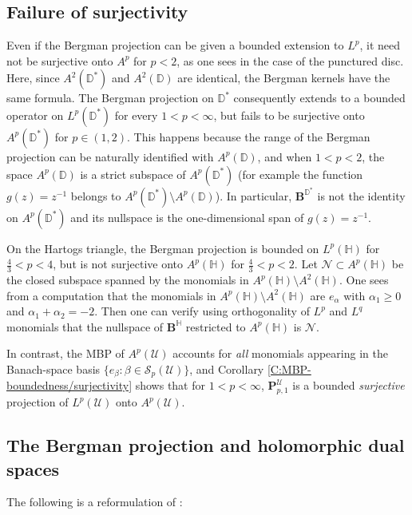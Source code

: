 \documentclass[letterpaper,11pt,reqno]{amsart}
\theoremstyle{plain}
\theoremstyle{definition}
\theoremstyle{remark}
\theoremstyle{remark}
\numberwithin{equation}{section}
\newcommand{\cs}{{\mathcal S}}
\newcommand{\D}{{\mathbb D}}
\newcommand{\h}{{\mathbb H}}
\newcommand{\Uu}{\mathscr{U}}
\begin{document}
\subsection{Failure of surjectivity}\label{SS:Inability-to-reproduce}
Even if the Bergman projection can be given a bounded extension to $L^p$, it need not be surjective onto $A^p$ for $p<2$, as one sees in the case of the punctured disc. 
Here, since $A^2(\D^{*})$ and $A^2(\D)$ are identical, the Bergman kernels have the same formula. 
The Bergman projection on $\D^*$ consequently extends to a bounded operator on $L^p(\D^*)$ for every $1<p<\infty$, but fails to be surjective onto $A^p(\D^*)$ for $p \in (1,2)$. 
This happens because the range of the Bergman projection can be naturally identified with $A^p(\D)$, and when $1<p<2$, the space $A^p(\D)$ is a strict subspace of $A^p(\D^*)$ (for example the function $g(z)=z^{-1}$ belongs to $A^p(\D^*) \setminus A^p(\D)$). 
In particular, $\bm{B}^{\D^*}$ is not the identity on $A^p(\D^*)$ and its nullspace is the one-dimensional span of $g(z)=z^{-1}$.
 
On the Hartogs triangle, the Bergman projection is bounded on $L^p(\h)$ for $\frac{4}{3} < p < 4$, but is not surjective onto $A^p(\h)$ for $\frac{4}{3} < p < 2$.
Let $\mathcal{N}\subset A^p(\h)$ be the closed subspace spanned by the monomials in $A^p(\h) \setminus A^2(\h)$. 
One sees from a computation that the monomials in $ A^p(\h) \setminus A^2(\h)$ are $e_\alpha$ with  $\alpha_1\ge0$ and $\alpha_1+\alpha_2 = -2$. 
Then one can verify using orthogonality of $L^p$ and $L^q$ monomials that the nullspace of $\bm{B}^\h$ restricted to $A^p(\h)$ is $\mathcal{N}$.

In contrast, the MBP of $A^p(\Uu)$ accounts for {\em all} monomials appearing in the Banach-space basis $\{e_\beta: \beta \in \cs_p(\Uu) \}$, and Corollary \ref{C:MBP-boundedness/surjectivity} shows that for $1<p<\infty$, $\bm{P}^{\Uu}_{p,1}$ is a bounded {\em surjective} projection of $L^p(\Uu)$ onto $A^p(\Uu)$.

\subsection{The Bergman projection and holomorphic dual spaces}\label{SS:Berg-proj-holomorphic-dual-spaces}

The following is a reformulation of \cite[Theorem~2.15]{ChEdMc19}:
\end{document}
